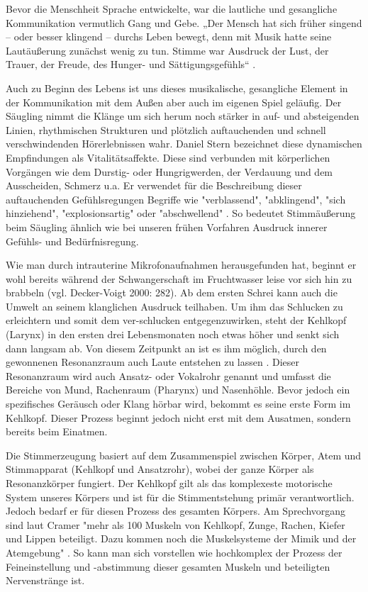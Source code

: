Bevor die Menschheit Sprache entwickelte, war die lautliche und gesangliche Kommunikation vermutlich Gang und Gebe. „Der Mensch hat sich früher singend – oder besser klingend – durchs Leben bewegt, denn mit Musik hatte seine Lautäußerung zunächst wenig zu tun. Stimme war Ausdruck der Lust, der Trauer, der Freude, des Hunger- und Sättigungsgefühls“ \autocite[8]{cramer1998}.

Auch zu Beginn des Lebens ist uns dieses musikalische, gesangliche Element in der Kommunikation mit dem Außen aber auch im eigenen Spiel geläufig. Der Säugling nimmt die Klänge um sich herum noch stärker in auf- und absteigenden Linien, rhythmischen Strukturen und plötzlich auftauchenden und schnell verschwindenden Hörerlebnissen wahr. Daniel Stern bezeichnet diese dynamischen Empfindungen als Vitalitätsaffekte. Diese sind verbunden mit körperlichen Vorgängen wie dem Durstig- oder Hungrigwerden, der Verdauung und dem Ausscheiden, Schmerz u.a. Er verwendet für die Beschreibung dieser auftauchenden Gefühlsregungen Begriffe wie "verblassend", "abklingend", "sich hinziehend", "explosionsartig" oder "abschwellend" \autocite[83]{stern2007}.
So bedeutet Stimmäußerung beim Säugling ähnlich wie bei unseren frühen Vorfahren Ausdruck innerer Gefühls- und Bedürfnisregung. 

Wie man durch intrauterine Mikrofonaufnahmen herausgefunden hat, beginnt er wohl bereits während der Schwangerschaft im Fruchtwasser leise vor sich hin zu brabbeln (vgl. Decker-Voigt 2000: 282). Ab dem ersten Schrei kann auch die Umwelt an seinem klanglichen Ausdruck teilhaben. Um ihm das Schlucken zu erleichtern und somit dem ver-schlucken entgegenzuwirken, steht der Kehlkopf (Larynx) in den ersten drei Lebensmonaten noch etwas höher und senkt sich dann langsam ab. Von diesem Zeitpunkt an ist es ihm möglich, durch den gewonnenen Resonanzraum auch Laute entstehen zu lassen \autocite[vgl.][36]{cramer1998}. Dieser Resonanzraum wird auch Ansatz- oder Vokalrohr genannt und umfasst die Bereiche von Mund, Rachenraum (Pharynx) und Nasenhöhle. Bevor jedoch ein spezifisches Geräusch oder Klang hörbar wird, bekommt es seine erste Form im Kehlkopf. Dieser Prozess beginnt jedoch nicht erst mit dem Ausatmen, sondern bereits beim Einatmen. 

Die Stimmerzeugung basiert auf dem Zusammenspiel zwischen Körper, Atem und Stimmapparat (Kehlkopf und Ansatzrohr), wobei der ganze Körper als Resonanzkörper fungiert. Der Kehlkopf gilt als das komplexeste motorische System unseres Körpers und ist für die Stimmentstehung primär verantwortlich. Jedoch bedarf er für diesen Prozess des gesamten Körpers. Am Sprechvorgang sind laut Cramer "mehr als 100 Muskeln von Kehlkopf, Zunge, Rachen, Kiefer und Lippen beteiligt. Dazu kommen noch die Muskelsysteme der Mimik und der Atemgebung" \autocite[40]{cramer1998}. So kann man sich vorstellen wie hochkomplex der Prozess der Feineinstellung und -abstimmung dieser gesamten Muskeln und beteiligten Nervenstränge ist. 

